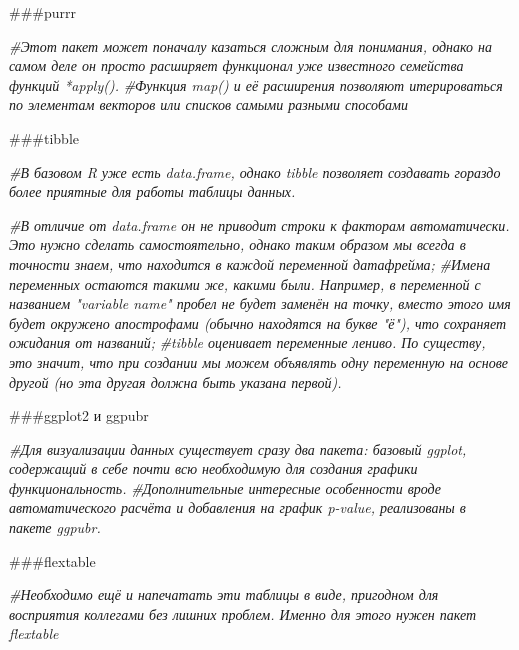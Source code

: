 \documentclass[
]{article}
\newenvironment{Shaded}{\begin{snugshade}}{\end{snugshade}}
\newcommand{\CommentTok}[1]{\textcolor[rgb]{0.56,0.35,0.01}{\textit{#1}}}
\begin{document}
\#\#\#purrr

\begin{Shaded}
\begin{Highlighting}[]
\CommentTok{\#Этот пакет может поначалу казаться сложным для понимания, однако на самом деле он просто расширяет функционал уже известного семейства функций *apply().}
\CommentTok{\#Функция map() и её расширения позволяют итерироваться по элементам векторов или списков самыми разными способами}
\end{Highlighting}
\end{Shaded}

\#\#\#tibble

\begin{Shaded}
\begin{Highlighting}[]
\CommentTok{\#В базовом R уже есть data.frame, однако tibble позволяет создавать гораздо более приятные для работы таблицы данных.}

\CommentTok{\#В отличие от data.frame он не приводит строки к факторам автоматически. Это нужно сделать самостоятельно, однако таким образом мы всегда в точности знаем, что находится в каждой переменной датафрейма;}
\CommentTok{\#Имена переменных остаются такими же, какими были. Например, в переменной с названием "variable name" пробел не будет заменён на точку, вместо этого имя будет окружено апострофами (обычно находятся на букве "ё"), что сохраняет ожидания от названий;}
\CommentTok{\#tibble оценивает переменные лениво. По существу, это значит, что при создании мы можем объявлять одну переменную на основе другой (но эта другая должна быть указана первой).}
\end{Highlighting}
\end{Shaded}

\#\#\#ggplot2 и ggpubr

\begin{Shaded}
\begin{Highlighting}[]
\CommentTok{\#Для визуализации данных существует сразу два пакета: базовый ggplot, содержащий в себе почти всю необходимую для создания графики функциональность.}
\CommentTok{\#Дополнительные интересные особенности вроде автоматического расчёта и добавления на график p{-}value, реализованы в пакете ggpubr.}
\end{Highlighting}
\end{Shaded}

\#\#\#flextable

\begin{Shaded}
\begin{Highlighting}[]
\CommentTok{\#Необходимо ещё и напечатать эти таблицы в виде, пригодном для восприятия коллегами без лишних проблем. Именно для этого нужен пакет flextable}
\end{Highlighting}
\end{Shaded}
\end{document}
